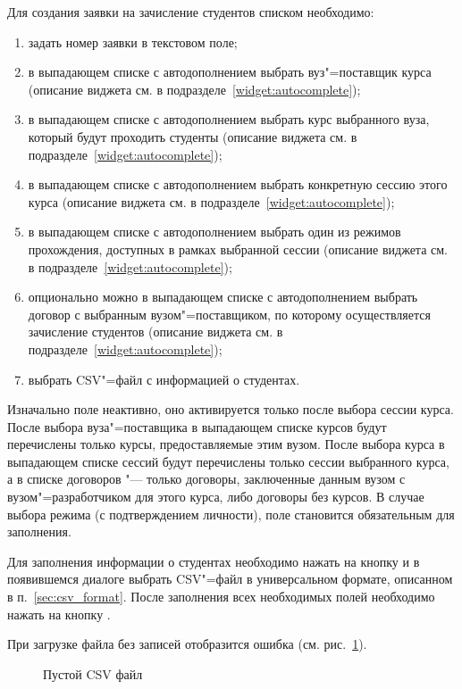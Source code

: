 Для создания заявки на зачисление студентов списком необходимо:
\begin{enumerate}
	\item задать номер заявки в текстовом поле;
	\item в выпадающем списке с автодополнением выбрать вуз"=поставщик курса
	(описание виджета см. в подразделе~\ref{widget:autocomplete});
	\item в выпадающем списке с автодополнением выбрать курс выбранного вуза, который будут проходить студенты 
	(описание виджета см. в подразделе~\ref{widget:autocomplete});
	\item в выпадающем списке с автодополнением выбрать конкретную сессию этого курса 
	(описание виджета см. в подразделе~\ref{widget:autocomplete});
	\item в выпадающем списке с автодополнением выбрать один из режимов прохождения, доступных в рамках выбранной сессии 
	(описание виджета см. в подразделе~\ref{widget:autocomplete});
	\item опционально можно в выпадающем списке с автодополнением выбрать договор с выбранным вузом"=поставщиком, 
	по которому осуществляется зачисление студентов (описание виджета см. в подразделе~\ref{widget:autocomplete});
	\item выбрать CSV"=файл с информацией о студентах. 
\end{enumerate}


Изначально поле  неактивно, оно активируется только после выбора сессии курса.
После выбора вуза"=поставщика в выпадающем списке курсов будут перечислены только курсы, предоставляемые этим вузом.
После выбора курса в выпадающем списке сессий будут перечислены только сессии выбранного курса, 
а в списке договоров "--- только договоры, заключенные данным вузом с вузом"=разработчиком для этого курса, либо договоры без курсов.
В случае выбора режима  (с подтверждением личности), поле  становится обязательным 
для заполнения. 

Для заполнения информации о студентах необходимо нажать на кнопку  и в появившемся диалоге выбрать 
CSV"=файл в универсальном формате, описанном в п.~\ref{sec:csv_format}. 
После заполнения всех необходимых полей необходимо нажать на кнопку .

При загрузке файла без записей отобразится ошибка (см. рис.~\ref{img:student:req_mass_enroll_empty_csv}).
\begin{figure}[H]
	\caption{Пустой CSV файл}
	\label{img:student:req_mass_enroll_empty_csv}
\end{figure}

